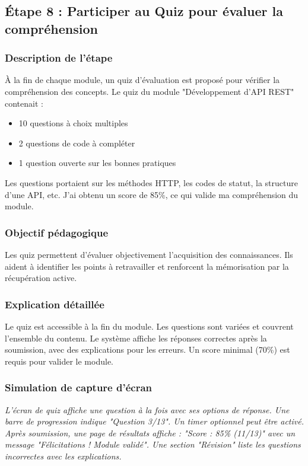\documentclass[12pt,a4paper]{article}
\begin{document}
\subsection{Étape 8 : Participer au Quiz pour évaluer la compréhension}

\subsubsection{Description de l'étape}

À la fin de chaque module, un quiz d'évaluation est proposé pour vérifier la compréhension des concepts. Le quiz du module "Développement d'API REST" contenait :
\begin{itemize}
    \item 10 questions à choix multiples
    \item 2 questions de code à compléter
    \item 1 question ouverte sur les bonnes pratiques
\end{itemize}

Les questions portaient sur les méthodes HTTP, les codes de statut, la structure d'une API, etc. J'ai obtenu un score de 85\%, ce qui valide ma compréhension du module.

\subsubsection{Objectif pédagogique}

Les quiz permettent d'évaluer objectivement l'acquisition des connaissances. Ils aident à identifier les points à retravailler et renforcent la mémorisation par la récupération active.

\subsubsection{Explication détaillée}

Le quiz est accessible à la fin du module. Les questions sont variées et couvrent l'ensemble du contenu. Le système affiche les réponses correctes après la soumission, avec des explications pour les erreurs. Un score minimal (70\%) est requis pour valider le module.

\subsubsection{Simulation de capture d'écran}

\textit{L'écran de quiz affiche une question à la fois avec ses options de réponse. Une barre de progression indique "Question 3/13". Un timer optionnel peut être activé. Après soumission, une page de résultats affiche : "Score : 85\% (11/13)" avec un message "Félicitations ! Module validé". Une section "Révision" liste les questions incorrectes avec les explications.}
\end{document}
